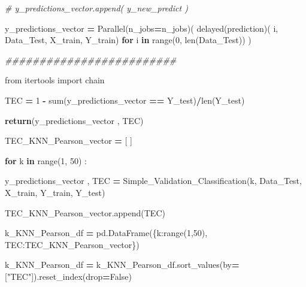 \documentclass[
  11pt,
  a4paper,
]{article}
\newenvironment{Shaded}{\begin{snugshade}}{\end{snugshade}}
\newcommand{\BuiltInTok}[1]{#1}
\newcommand{\CommentTok}[1]{\textcolor[rgb]{0.56,0.35,0.01}{\textit{#1}}}
\newcommand{\ControlFlowTok}[1]{\textcolor[rgb]{0.13,0.29,0.53}{\textbf{#1}}}
\newcommand{\DecValTok}[1]{\textcolor[rgb]{0.00,0.00,0.81}{#1}}
\newcommand{\ImportTok}[1]{#1}
\newcommand{\KeywordTok}[1]{\textcolor[rgb]{0.13,0.29,0.53}{\textbf{#1}}}
\newcommand{\NormalTok}[1]{#1}
\newcommand{\OperatorTok}[1]{\textcolor[rgb]{0.81,0.36,0.00}{\textbf{#1}}}
\newcommand{\StringTok}[1]{\textcolor[rgb]{0.31,0.60,0.02}{#1}}
\newcommand{\VariableTok}[1]{\textcolor[rgb]{0.00,0.00,0.00}{#1}}
\begin{document}
\begin{Shaded}
\begin{Highlighting}[]
        \CommentTok{\# y\_predictions\_vector.append( y\_new\_predict )}

    
\NormalTok{    y\_predictions\_vector }\OperatorTok{=}\NormalTok{ Parallel(n\_jobs}\OperatorTok{=}\NormalTok{n\_jobs)( delayed(prediction)( i, Data\_Test, X\_train, Y\_train) }\ControlFlowTok{for}\NormalTok{ i }\KeywordTok{in} \BuiltInTok{range}\NormalTok{(}\DecValTok{0}\NormalTok{, }\BuiltInTok{len}\NormalTok{(Data\_Test)) )}

    \CommentTok{\#\#\#\#\#\#\#\#\#\#\#\#\#\#\#\#\#\#\#\#\#\#\#\#\#}

    \ImportTok{from}\NormalTok{ itertools }\ImportTok{import}\NormalTok{ chain}

\NormalTok{    TEC }\OperatorTok{=} \DecValTok{1} \OperatorTok{{-}} \BuiltInTok{sum}\NormalTok{(y\_predictions\_vector }\OperatorTok{==}\NormalTok{ Y\_test)}\OperatorTok{/}\BuiltInTok{len}\NormalTok{(Y\_test)     }

 
    \ControlFlowTok{return}\NormalTok{(y\_predictions\_vector , TEC)}
\end{Highlighting}
\end{Shaded}

\begin{Shaded}
\begin{Highlighting}[]
\NormalTok{TEC\_KNN\_Pearson\_vector }\OperatorTok{=}\NormalTok{ [ ]}

\ControlFlowTok{for}\NormalTok{ k }\KeywordTok{in} \BuiltInTok{range}\NormalTok{(}\DecValTok{1}\NormalTok{, }\DecValTok{50}\NormalTok{) :}

\NormalTok{    y\_predictions\_vector , TEC }\OperatorTok{=}\NormalTok{ Simple\_Validation\_Classification(k, Data\_Test, X\_train, Y\_train, Y\_test)}

\NormalTok{    TEC\_KNN\_Pearson\_vector.append(TEC)}
\end{Highlighting}
\end{Shaded}

\begin{Shaded}
\begin{Highlighting}[]
\NormalTok{k\_KNN\_Pearson\_df }\OperatorTok{=}\NormalTok{ pd.DataFrame(\{}\StringTok{\textquotesingle{}k\textquotesingle{}}\NormalTok{:}\BuiltInTok{range}\NormalTok{(}\DecValTok{1}\NormalTok{,}\DecValTok{50}\NormalTok{), }\StringTok{\textquotesingle{}TEC\textquotesingle{}}\NormalTok{:TEC\_KNN\_Pearson\_vector\})}

\NormalTok{k\_KNN\_Pearson\_df }\OperatorTok{=}\NormalTok{ k\_KNN\_Pearson\_df.sort\_values(by}\OperatorTok{=}\NormalTok{[}\StringTok{"TEC"}\NormalTok{]).reset\_index(drop}\OperatorTok{=}\VariableTok{False}\NormalTok{)}
\end{Highlighting}
\end{Shaded}
\end{document}

